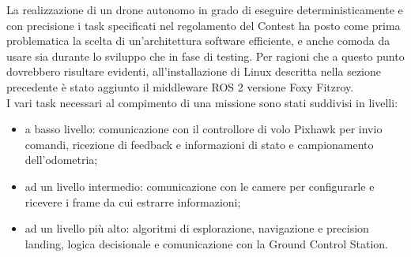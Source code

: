 \indent La realizzazione di un drone autonomo in grado di eseguire deterministicamente e con precisione i task specificati nel regolamento del Contest ha posto come prima problematica la scelta di un'architettura software efficiente, e anche comoda da usare sia durante lo sviluppo che in fase di testing. Per ragioni che a questo punto dovrebbero risultare evidenti, all'installazione di Linux descritta nella sezione precedente è stato aggiunto il middleware ROS 2 versione Foxy Fitzroy.\\
I vari task necessari al compimento di una missione sono stati suddivisi in livelli:
\begin{itemize}
    \item a basso livello: comunicazione con il controllore di volo Pixhawk per invio comandi, ricezione di feedback e informazioni di stato e campionamento dell'odometria;
    \item ad un livello intermedio: comunicazione con le camere per configurarle e ricevere i frame da cui estrarre informazioni;
    \item ad un livello più alto: algoritmi di esplorazione, navigazione e precision landing, logica decisionale e comunicazione con la Ground Control Station.
\end{itemize}
